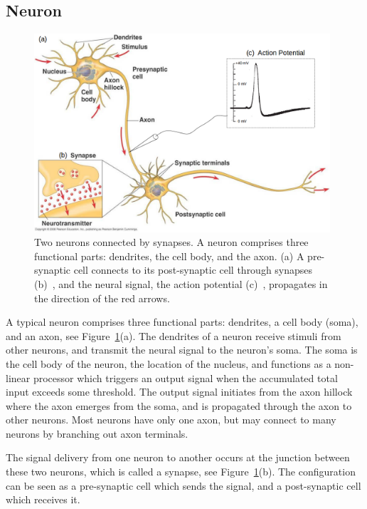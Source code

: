 \subsection{Neuron}
	\begin{figure}[bt]
	\centering
	\includegraphics[width=0.98\textwidth]{pics_snn/neuron2.png}
	\caption[Two neurons connected by synapses~\citep{reece2011campbell,hodgkin1939action}.]{Two neurons connected by synapses. 
		A neuron comprises three functional parts: dendrites, the cell body, and the axon. (a) A pre-synaptic cell connects to its post-synaptic cell through synapses (b)~\citep{reece2011campbell}, and the neural signal, the action potential (c)~\citep{hodgkin1939action}, propagates in the direction of the red arrows. }
	\label{Fig:neuron_basic}
\end{figure}

A typical neuron comprises three functional parts: dendrites, a cell body (soma), and an axon, see Figure~\ref{Fig:neuron_basic}(a).
The dendrites of a neuron receive stimuli from other neurons, and transmit the neural signal to the neuron's soma.
The soma is the cell body of the neuron, the location of the nucleus, and functions as a non-linear processor which triggers an output signal when the accumulated total input exceeds some threshold.
The output signal initiates from the axon hillock where the axon emerges from the soma, and is propagated through the axon to other neurons.
Most neurons have only one axon, but may connect to many neurons by branching out axon terminals. 


The signal delivery from one neuron to another occurs at the junction between these two neurons, which is called a synapse, see Figure~\ref{Fig:neuron_basic}(b).
The configuration can be seen as a pre-synaptic cell which sends the signal, and a post-synaptic cell which receives it.

